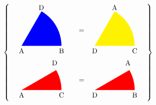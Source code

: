 \documentclass{article}
\begin{document}
\[
\left\{
\begin{array}{c}
\begin{array}{c}
\begin{tikzpicture}
    \fill[blue]
    (0,0) coordinate (A)
    -- (2,0) coordinate (B)
    arc[start angle=0, end angle=60, radius=2]
    -- cycle;
    \node[below] at (A) {A};
    \node[below] at (B) {B};
    \node[below left] at (60:2.5) {D};
\end{tikzpicture}
\end{array}
\quad =
\begin{array}{c}
\begin{tikzpicture}
    \fill[yellow]
    (0,0) coordinate (A)
    -- (2,0) coordinate (B)
    arc[start angle=0, end angle=60, radius=2]
    -- cycle;
    \node[below] at (A) {D};
    \node[below] at (B) {C};
    \node[below left] at (60:2.5) {A};
\end{tikzpicture}
\end{array}
\\ %
\begin{array}{c}
\begin{tikzpicture}
    \fill[red]
    (0,0) coordinate (A)
    -- (2,0) coordinate (B)
    arc[start angle=0, end angle=30, radius=2]
    -- cycle;
    \node[below] at (A) {A};
    \node[below] at (B) {C};
    \node[below left] at (40:2.5) {D};
\end{tikzpicture}
\end{array}
\quad =
\begin{array}{c}
\begin{tikzpicture}
    \fill[red]
    (0,0) coordinate (A)
    -- (2,0) coordinate (B)
    arc[start angle=0, end angle=30, radius=2]
    -- cycle;
    \node[below] at (A) {D};
    \node[below] at (B) {B};
    \node[below left] at (40:2.5) {A};
\end{tikzpicture}
\end{array}
\end{array}
\right\}
\]
\end{document}
